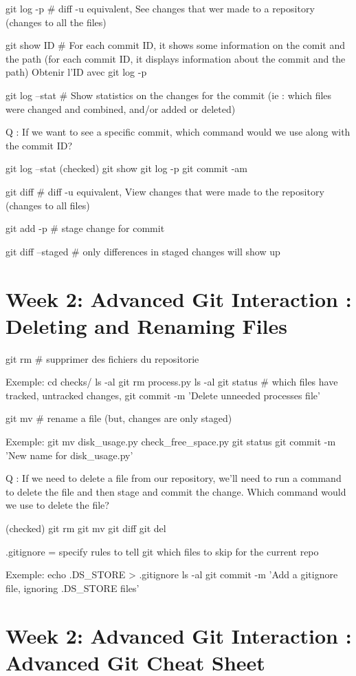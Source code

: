\documentclass[11pt, onecolumn]{article}
\begin{document}
git log -p  # diff -u equivalent, See changes that wer made to a repository (changes to all the files)

git show ID   # For each commit ID, it shows some information on the comit and the path (for each commit ID, it displays information about the commit and the path) Obtenir l'ID avec git log -p

git log --stat  # Show statistics on the changes for the commit (ie : which files were changed and combined, and/or added or deleted)

Q : If we want to see a specific commit, which command would we use along with the commit ID?

git log --stat
(checked) git show
git log -p
git commit -am 

git diff  # diff -u equivalent, View changes that were made to the repository (changes to all files)

git add -p  # stage change for commit

git diff --staged  # only differences in staged changes will show up  


\section{Week 2: Advanced Git Interaction : Deleting and Renaming Files}

git rm   # supprimer des fichiers du repositorie

Exemple:
cd checks/
ls -al
git rm process.py
ls -al
git status   # which files have tracked, untracked changes, 
git commit -m 'Delete unneeded processes file'

git mv   # rename a file (but, changes are only staged)

Exemple:
git mv disk_usage.py check_free_space.py
git status
git commit -m 'New name for disk_usage.py'

Q : If we need to delete a file from our repository, we'll need to run a command to delete the file and then stage and commit the change. Which command would we use to delete the file?

(checked) git rm
git mv
git diff
git del

.gitignore  = specify rules to tell git which files to skip for the current repo

Exemple:
echo .DS_STORE > .gitignore
ls -al
git commit -m 'Add a gitignore file, ignoring .DS_STORE files'


\section{Week 2: Advanced Git Interaction : Advanced Git Cheat Sheet}
\end{document}
